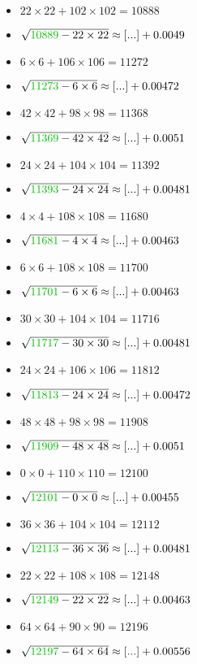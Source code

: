 \documentclass[12pt]{article}
\begin{document}
\begin{multicols}{2}
\begin{itemize}
\item $22\times22 + 102\times102 = 10888$
\item $\sqrt{ {\color{green!75!black}{10889}} - 22\times 22 } \approx [...] + 0.0049$
\item $6\times6 + 106\times106 = 11272$
\item $\sqrt{ {\color{green!75!black}{11273}} - 6\times 6 } \approx [...] + 0.00472$
\item $42\times42 + 98\times98 = 11368$
\item $\sqrt{ {\color{green!75!black}{11369}} - 42\times 42 } \approx [...] + 0.0051$
\item $24\times24 + 104\times104 = 11392$
\item $\sqrt{ {\color{green!75!black}{11393}} - 24\times 24 } \approx [...] + 0.00481$
\item $4\times4 + 108\times108 = 11680$
\item $\sqrt{ {\color{green!75!black}{11681}} - 4\times 4 } \approx [...] + 0.00463$
\item $6\times6 + 108\times108 = 11700$
\item $\sqrt{ {\color{green!75!black}{11701}} - 6\times 6 } \approx [...] + 0.00463$
\item $30\times30 + 104\times104 = 11716$
\item $\sqrt{ {\color{green!75!black}{11717}} - 30\times 30 } \approx [...] + 0.00481$
\item $24\times24 + 106\times106 = 11812$
\item $\sqrt{ {\color{green!75!black}{11813}} - 24\times 24 } \approx [...] + 0.00472$
\item $48\times48 + 98\times98 = 11908$
\item $\sqrt{ {\color{green!75!black}{11909}} - 48\times 48 } \approx [...] + 0.0051$
\item $0\times0 + 110\times110 = 12100$
\item $\sqrt{ {\color{green!75!black}{12101}} - 0\times 0 } \approx [...] + 0.00455$
\item $36\times36 + 104\times104 = 12112$
\item $\sqrt{ {\color{green!75!black}{12113}} - 36\times 36 } \approx [...] + 0.00481$
\item $22\times22 + 108\times108 = 12148$
\item $\sqrt{ {\color{green!75!black}{12149}} - 22\times 22 } \approx [...] + 0.00463$
\item $64\times64 + 90\times90 = 12196$
\item $\sqrt{ {\color{green!75!black}{12197}} - 64\times 64 } \approx [...] + 0.00556$

\end{itemize}
\end{multicols}
\end{document}
